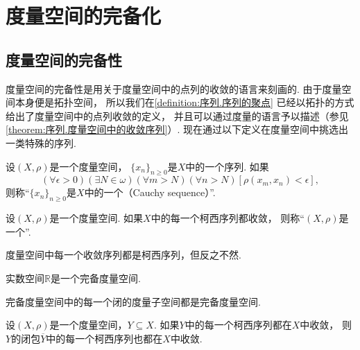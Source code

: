 \section{度量空间的完备化}
\subsection{度量空间的完备性}
度量空间的完备性是用关于度量空间中的点列的收敛的语言来刻画的.
由于度量空间本身便是拓扑空间，
所以我们在\cref{definition:序列.序列的聚点}
已经以拓扑的方式给出了度量空间中的点列收敛的定义，
并且可以通过度量的语言予以描述（参见\cref{theorem:序列.度量空间中的收敛序列}）.
现在通过以下定义在度量空间中挑选出一类特殊的序列.

\begin{definition}\label{definition:度量空间的完备化.度量空间中的柯西序列}
设\((X,\rho)\)是一个度量空间，
\(\{x_n\}_{n\geq0}\)是\(X\)中的一个序列.
如果\[
	(\forall\epsilon>0)
	(\exists N\in\omega)
	(\forall m>N)
	(\forall n>N)
	[\rho(x_m,x_n)<\epsilon],
\]
则称“\(\{x_n\}_{n\geq0}\)是\(X\)中的一个（Cauchy sequence）”.
\end{definition}

\begin{definition}\label{definition:度量空间的完备化.完备度量空间}
设\((X,\rho)\)是一个度量空间.
如果\(X\)中的每一个柯西序列都收敛，
则称“\((X,\rho)\)是一个”.
\end{definition}

\begin{proposition}
度量空间中每一个收敛序列都是柯西序列，但反之不然.
\end{proposition}

\begin{example}
实数空间\(\mathbb{R}\)是一个完备度量空间.
\end{example}

\begin{theorem}
完备度量空间中的每一个闭的度量子空间都是完备度量空间.
\end{theorem}

\begin{lemma}
设\((X,\rho)\)是一个度量空间，\(Y \subseteq X\).
如果\(Y\)中的每一个柯西序列都在\(X\)中收敛，
则\(Y\)的闭包\(\overline{Y}\)中的每一个柯西序列也都在\(X\)中收敛.
\end{lemma}

